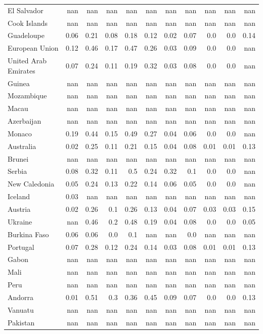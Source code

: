 \documentclass[11pt]{article}
\begin{document}
\begin{center}
\begin{longtable}{|p{70pt}|r|r|r|r|r|r|r|r|r|r|}
El Salvador& nan& nan& nan& nan& nan& nan& nan& nan& nan& nan\\
Cook Islands& nan& nan& nan& nan& nan& nan& nan& nan& nan& nan\\
Guadeloupe& 0.06& 0.21& 0.08& 0.18& 0.12& 0.02& 0.07& 0.0& 0.0& 0.14\\
European Union& 0.12& 0.46& 0.17& 0.47& 0.26& 0.03& 0.09& 0.0& 0.0& nan\\
United Arab Emirates& 0.07& 0.24& 0.11& 0.19& 0.32& 0.03& 0.08& 0.0& 0.0& nan\\
Guinea& nan& nan& nan& nan& nan& nan& nan& nan& nan& nan\\
Mozambique& nan& nan& nan& nan& nan& nan& nan& nan& nan& nan\\
Macau& nan& nan& nan& nan& nan& nan& nan& nan& nan& nan\\
Azerbaijan& nan& nan& nan& nan& nan& nan& nan& nan& nan& nan\\
Monaco& 0.19& 0.44& 0.15& 0.49& 0.27& 0.04& 0.06& 0.0& 0.0& nan\\
Australia& 0.02& 0.25& 0.11& 0.21& 0.15& 0.04& 0.08& 0.01& 0.01& 0.13\\
Brunei& nan& nan& nan& nan& nan& nan& nan& nan& nan& nan\\
Serbia& 0.08& 0.32& 0.11& 0.5& 0.24& 0.32& 0.1& 0.0& 0.0& nan\\
New Caledonia& 0.05& 0.24& 0.13& 0.22& 0.14& 0.06& 0.05& 0.0& 0.0& nan\\
Iceland& 0.03& nan& nan& nan& nan& nan& nan& nan& nan& nan\\
Austria& 0.02& 0.26& 0.1& 0.26& 0.13& 0.04& 0.07& 0.03& 0.03& 0.15\\
Ukraine& nan& 0.46& 0.2& 0.48& 0.19& 0.04& 0.08& 0.0& 0.0& 0.05\\
Burkina Faso& 0.06& 0.06& 0.0& 0.1& nan& nan& 0.0& nan& nan& nan\\
Portugal& 0.07& 0.28& 0.12& 0.24& 0.14& 0.03& 0.08& 0.01& 0.01& 0.13\\
Gabon& nan& nan& nan& nan& nan& nan& nan& nan& nan& nan\\
Mali& nan& nan& nan& nan& nan& nan& nan& nan& nan& nan\\
Peru& nan& nan& nan& nan& nan& nan& nan& nan& nan& nan\\
Andorra& 0.01& 0.51& 0.3& 0.36& 0.45& 0.09& 0.07& 0.0& 0.0& 0.13\\
Vanuatu& nan& nan& nan& nan& nan& nan& nan& nan& nan& nan\\
Pakistan& nan& nan& nan& nan& nan& nan& nan& nan& nan& nan\\

\end{longtable}
\end{center}
\end{document}
